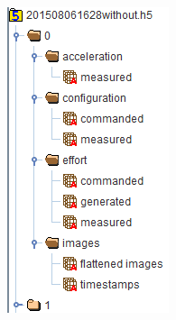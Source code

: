 \documentclass{beamer}
\begin{document}
\begin{frame}
\begin{columns}[onlytextwidth]
\begin{column}{.3\textwidth}
\begin{figure}
                    \includegraphics[width=.7\columnwidth]{figs/h5}
                \end{figure}
            \end{column}
        \end{columns}
    \end{frame}
\end{document}
